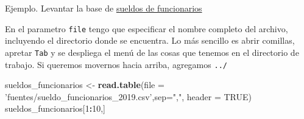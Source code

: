 \documentclass[]{book}
\newenvironment{Shaded}{\begin{snugshade}}{\end{snugshade}}
\newcommand{\DataTypeTok}[1]{\textcolor[rgb]{0.13,0.29,0.53}{#1}}
\newcommand{\DecValTok}[1]{\textcolor[rgb]{0.00,0.00,0.81}{#1}}
\newcommand{\KeywordTok}[1]{\textcolor[rgb]{0.13,0.29,0.53}{\textbf{#1}}}
\newcommand{\NormalTok}[1]{#1}
\newcommand{\OperatorTok}[1]{\textcolor[rgb]{0.81,0.36,0.00}{\textbf{#1}}}
\newcommand{\OtherTok}[1]{\textcolor[rgb]{0.56,0.35,0.01}{#1}}
\newcommand{\StringTok}[1]{\textcolor[rgb]{0.31,0.60,0.02}{#1}}
\begin{document}
Ejemplo. Levantar la base de \href{https://data.buenosaires.gob.ar/dataset/sueldo-funcionarios}{sueldos de funcionarios}

En el parametro \texttt{file} tengo que especificar el nombre completo del archivo, incluyendo el directorio donde se encuentra. Lo más sencillo es abrir comillas, apretar \texttt{Tab} y se despliega el menú de las cosas que tenemos en el directorio de trabajo. Si queremos movernos hacia arriba, agregamos \texttt{../}

\begin{Shaded}
\begin{Highlighting}[]
\NormalTok{sueldos_funcionarios <-}\StringTok{ }\KeywordTok{read.table}\NormalTok{(}\DataTypeTok{file =} \StringTok{'fuentes/sueldo_funcionarios_2019.csv'}\NormalTok{,}\DataTypeTok{sep=}\StringTok{","}\NormalTok{, }\DataTypeTok{header =} \OtherTok{TRUE}\NormalTok{)}
\NormalTok{sueldos_funcionarios[}\DecValTok{1}\OperatorTok{:}\DecValTok{10}\NormalTok{,]}
\end{Highlighting}
\end{Shaded}
\end{document}
